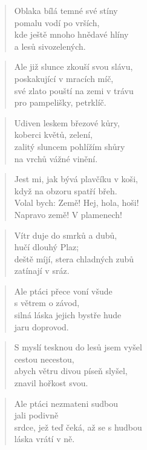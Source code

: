 \documentclass{book}
\begin{document}
\newpage
{}
\begin{verse}
Oblaka bílá temné své stíny\\
pomalu vodí po vrších,\\
kde ještě mnoho hnědavé hlíny\\
a lesů sivozelených.
\end{verse}
\begin{verse}
Ale již slunce zkouší svou slávu,\\
poskakující v mracích míč,\\
své zlato pouští na zemi v trávu\\
pro pampelišky, petrklíč.
\end{verse}
\begin{verse}
Udiven leskem březové kůry,\\
koberci květů, zelení,\\
zalitý sluncem pohlížím shůry\\
na vrchů vážné vinění.
\end{verse}
\begin{verse}
Jest mi, jak bývá plavčíku v koši,\\
když na obzoru spatří břeh.\\
Volal bych: Země! Hej, hola, hoši!\\
Napravo země! V plamenech!
\end{verse}
\newpage
{}
\begin{verse}
Vítr duje do smrků a dubů,\\
hučí dlouhý Plaz;\\
deště míjí, stera chladných zubů\\
zatínají v sráz.
\end{verse}
\begin{verse}
Ale ptáci přece voní všude\\
s větrem o závod,\\
silná láska jejich bystře hude\\
jaru doprovod.
\end{verse}
\begin{verse}
S myslí tesknou do lesů jsem vyšel\\
cestou necestou,\\
abych větru divou píseň slyšel,\\
znavil hořkost svou.
\end{verse}
\begin{verse}
Ale ptáci nezmateni sudbou\\
jali podivně\\
srdce, jež teď čeká, až se s hudbou\\
láska vrátí v ně.
\end{verse}
\end{document}
